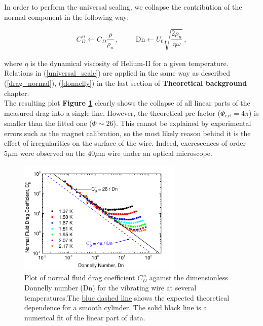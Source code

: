 In order to perform the universal scaling, we collapse the contribution of the normal component in the following way:

\begin{equation}
C_D^{\,n} \leftarrow C_D \frac{\rho}{\rho_n}\,,
\hspace{1cm}
\text{Dn} \leftarrow U_0 \sqrt{\frac{2\rho_n}{\eta\omega}}\,,
\label{universal_scale}
\end{equation}

where $\eta$ is the dynamical viscosity of Helium-II for a given temperature. Relations in (\ref{universal_scale}) are applied in the same way as described (\ref{drag_normal}), (\ref{donnelly}) in the last section of \textbf{Theoretical background} chapter.\\
The resulting plot \textbf{Figure \ref{wire_drag_donnelly}} clearly shows the collapse of all linear parts of the measured drag into a single line. However, the theoretical pre-factor ($\Phi_{\text{cyl}} = 4\pi$) is smaller than the fitted one ($\Phi \sim 26$). This cannot be explained by experimental errors such as the magnet calibration, so the most likely reason behind it is the effect of irregularities on the surface of the wire. Indeed, excrescences of order $5 \mu\text{m}$ were observed on the $40 \mu \text{m}$ wire under an optical microscope.


\begin{figure}[h]
	\centering
	\includegraphics[width=0.7\textwidth]{graphics/results/wire_drag_donnelly}
	\caption{Plot of normal fluid drag coefficient $C_D^{\,n}$ against the dimensionless Donnelly number (Dn) for the vibrating wire at several temperatures.The \underline{blue dashed line} shows the expected theoretical dependence \cite{universal_scaling} for a smooth cylinder. The \underline{solid black line} is a numerical fit of the linear part of data.}
	\label{wire_drag_donnelly}
\end{figure}


